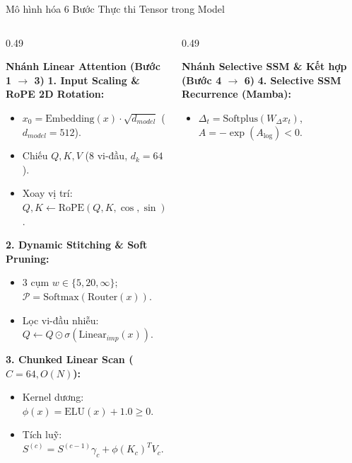 \documentclass[aspectratio=169, 10pt]{beamer}
\begin{document}
\begin{frame}{Mô hình hóa 6 Bước Thực thi Tensor trong Model}
  \begin{columns}[t]
    \begin{column}{0.49\textwidth}
      \begin{block}{\textbf{Nhánh Linear Attention (Bước 1 $\to$ 3)}}
        \footnotesize
        \textbf{1. Input Scaling \& RoPE 2D Rotation:}
        \begin{itemize}
          \setlength{\itemsep}{0pt}
          \item $x_0 = \text{Embedding}(x) \cdot \sqrt{d_{model}}$ ($d_{model}=512$).
          \item Chiếu $Q, K, V$ ($8$ vi-đầu, $d_k=64$).
          \item Xoay vị trí: $Q, K \leftarrow \text{RoPE}(Q, K, \cos, \sin)$.
        \end{itemize}
        \textbf{2. Dynamic Stitching \& Soft Pruning:}
        \begin{itemize}
          \setlength{\itemsep}{0pt}
          \item 3 cụm $w \in \{5, 20, \infty\}$; $\mathcal{P} = \text{Softmax}(\text{Router}(x))$.
          \item Lọc vi-đầu nhiễu: $Q \leftarrow Q \odot \sigma(\text{Linear}_{imp}(x))$.
        \end{itemize}
        \textbf{3. Chunked Linear Scan ($C=64, O(N)$):}
        \begin{itemize}
          \setlength{\itemsep}{0pt}
          \item Kernel dương: $\phi(x) = \text{ELU}(x) + 1.0 \ge 0$.
          \item Tích luỹ: $S^{(c)} = S^{(c-1)} \gamma_c + \phi(K_c)^T V_c$.
        \end{itemize}
      \end{block}
    \end{column}
    \begin{column}{0.49\textwidth}
      \begin{exampleblock}{\textbf{Nhánh Selective SSM \& Kết hợp (Bước 4 $\to$ 6)}}
        \footnotesize
        \textbf{4. Selective SSM Recurrence (Mamba):}
        \begin{itemize}
          \setlength{\itemsep}{0pt}
          \item $\Delta_t = \text{Softplus}(W_\Delta x_t)$, $A = -\exp(A_{\log}) < 0$.

\end{itemize}
\end{exampleblock}
\end{column}
\end{columns}
\end{frame}
\end{document}
